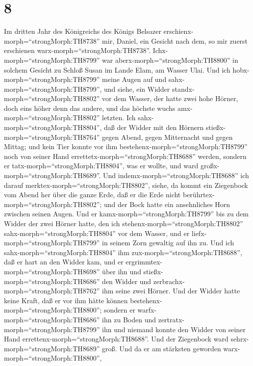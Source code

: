 \hypertarget{section-7}{%
\section{8}\label{section-7}}

 Im dritten Jahr des Königreichs des Königs Belsazer
erschienx-morph=``strongMorph:TH8738'' mir, Daniel, ein Gesicht nach
dem, so mir zuerst erschienen warx-morph=``strongMorph:TH8738''.
 Ichx-morph=``strongMorph:TH8799'' war
aberx-morph=``strongMorph:TH8800'' in solchem Gesicht zu Schloß Susan im
Lande Elam, am Wasser Ulai.  Und ich
hobx-morph=``strongMorph:TH8799'' meine Augen auf und
sahx-morph=``strongMorph:TH8799'', und siehe, ein Widder
standx-morph=``strongMorph:TH8802'' vor dem Wasser, der hatte zwei hohe
Hörner, doch eins höher denn das andere, und das höchste wuchs
amx-morph=``strongMorph:TH8802'' letzten.  Ich
sahx-morph=``strongMorph:TH8804'', daß der Widder mit den Hörnern
stießx-morph=``strongMorph:TH8764'' gegen Abend, gegen Mitternacht und
gegen Mittag; und kein Tier konnte vor ihm
bestehenx-morph=``strongMorph:TH8799'' noch von seiner Hand
errettetx-morph=``strongMorph:TH8688'' werden, sondern er
tatx-morph=``strongMorph:TH8804'', was er wollte, und ward
großx-morph=``strongMorph:TH8689''.  Und
indemx-morph=``strongMorph:TH8688'' ich darauf
merktex-morph=``strongMorph:TH8802'', siehe, da kommt ein Ziegenbock vom
Abend her über die ganze Erde, daß er die Erde nicht
berührtex-morph=``strongMorph:TH8802''; und der Bock hatte ein
ansehnliches Horn zwischen seinen Augen.  Und er
kamx-morph=``strongMorph:TH8799'' bis zu dem Widder der zwei Hörner
hatte, den ich stehenx-morph=``strongMorph:TH8802''
sahx-morph=``strongMorph:TH8804'' vor dem Wasser, und er
liefx-morph=``strongMorph:TH8799'' in seinem Zorn gewaltig auf ihn zu.
 Und ich sahx-morph=``strongMorph:TH8804'' ihm
zux-morph=``strongMorph:TH8688'', daß er hart an den Widder kam, und er
ergrimmtex-morph=``strongMorph:TH8698'' über ihn und
stießx-morph=``strongMorph:TH8686'' den Widder und
zerbrachx-morph=``strongMorph:TH8762'' ihm seine zwei Hörner. Und der
Widder hatte keine Kraft, daß er vor ihm hätte können
bestehenx-morph=``strongMorph:TH8800''; sondern er
warfx-morph=``strongMorph:TH8686'' ihn zu Boden und
zertratx-morph=``strongMorph:TH8799'' ihn und niemand konnte den Widder
von seiner Hand errettenx-morph=``strongMorph:TH8688''.  Und
der Ziegenbock ward sehrx-morph=``strongMorph:TH8689'' groß. Und da er
am stärksten geworden warx-morph=``strongMorph:TH8800'',
